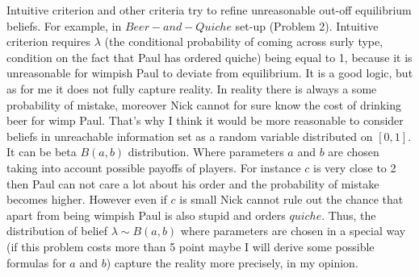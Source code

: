\documentclass[a4paper]{article}
\begin{document}
	Intuitive criterion and other criteria try to refine unreasonable out-off equilibrium beliefs. For example, in $Beer-and-Quiche$ set-up (Problem 2). Intuitive criterion requires $\lambda$ (the conditional probability of coming across surly type, condition on the fact that Paul has ordered quiche) being equal to 1, because it is unreasonable for wimpish Paul to deviate from equilibrium. It is a good logic, but as for me it does not fully capture reality. In reality there is always a some probability of mistake, moreover Nick cannot for sure know the cost of drinking beer for wimp Paul. That's why I think it would be more reasonable to consider beliefs in unreachable information set as a random variable distributed on $[0, 1]$. It can be beta $B(a, b)$ distribution. Where parameters $a$ and $b$ are chosen taking into account possible payoffs of players. For instance $c$ is very close to 2 then Paul can not care a lot about his order and the probability of mistake becomes higher. However even if $c$ is small Nick cannot rule out the chance that apart from being wimpish Paul is also stupid and orders $quiche$. Thus, the distribution of belief $\lambda \sim B(a, b)$ where parameters are chosen in a special way (if this problem costs more than 5 point maybe I will derive some possible formulas for $a$ and $b$) capture the reality more precisely, in my opinion.
\end{document}
